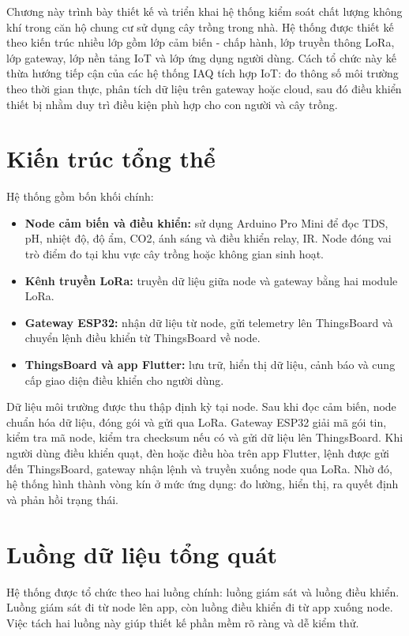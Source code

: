Chương này trình bày thiết kế và triển khai hệ thống kiểm soát chất lượng không khí trong căn hộ chung cư sử dụng cây trồng trong nhà. Hệ thống được thiết kế theo kiến trúc nhiều lớp gồm lớp cảm biến - chấp hành, lớp truyền thông LoRa, lớp gateway, lớp nền tảng IoT và lớp ứng dụng người dùng. Cách tổ chức này kế thừa hướng tiếp cận của các hệ thống IAQ tích hợp IoT: đo thông số môi trường theo thời gian thực, phân tích dữ liệu trên gateway hoặc cloud, sau đó điều khiển thiết bị nhằm duy trì điều kiện phù hợp cho con người và cây trồng.

\section{Kiến trúc tổng thể}
\label{sec:architecture}
Hệ thống gồm bốn khối chính:
\begin{itemize}
    \item \textbf{Node cảm biến và điều khiển:} sử dụng Arduino Pro Mini để đọc TDS, pH, nhiệt độ, độ ẩm, CO2, ánh sáng và điều khiển relay, IR. Node đóng vai trò điểm đo tại khu vực cây trồng hoặc không gian sinh hoạt.
    \item \textbf{Kênh truyền LoRa:} truyền dữ liệu giữa node và gateway bằng hai module LoRa.
    \item \textbf{Gateway ESP32:} nhận dữ liệu từ node, gửi telemetry lên ThingsBoard và chuyển lệnh điều khiển từ ThingsBoard về node.
    \item \textbf{ThingsBoard và app Flutter:} lưu trữ, hiển thị dữ liệu, cảnh báo và cung cấp giao diện điều khiển cho người dùng.
\end{itemize}

Dữ liệu môi trường được thu thập định kỳ tại node. Sau khi đọc cảm biến, node chuẩn hóa dữ liệu, đóng gói và gửi qua LoRa. Gateway ESP32 giải mã gói tin, kiểm tra mã node, kiểm tra checksum nếu có và gửi dữ liệu lên ThingsBoard. Khi người dùng điều khiển quạt, đèn hoặc điều hòa trên app Flutter, lệnh được gửi đến ThingsBoard, gateway nhận lệnh và truyền xuống node qua LoRa. Nhờ đó, hệ thống hình thành vòng kín ở mức ứng dụng: đo lường, hiển thị, ra quyết định và phản hồi trạng thái.

\section{Luồng dữ liệu tổng quát}
Hệ thống được tổ chức theo hai luồng chính: luồng giám sát và luồng điều khiển. Luồng giám sát đi từ node lên app, còn luồng điều khiển đi từ app xuống node. Việc tách hai luồng này giúp thiết kế phần mềm rõ ràng và dễ kiểm thử.

